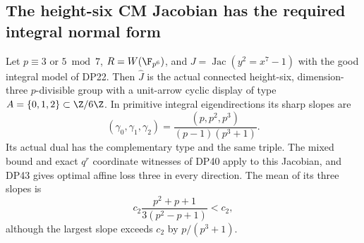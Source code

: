 \subsection{The height-six CM Jacobian has the required integral normal form}

\begin{proposition}\label{DP45}
Let $p\equiv3$ or $5\bmod7$, $R=W(\F_{p^6})$, and
$J=\operatorname{Jac}(y^2=x^7-1)$ with the good integral model of DP22.
Then $\widehat J$ is the actual connected height-six, dimension-three
$p$-divisible group with a unit-arrow cyclic display of type
$A=\{0,1,2\}\subset\Z/6\Z$.
In primitive integral eigendirections its sharp slopes are
\[
 (\gamma_0,\gamma_1,\gamma_2)
       =\frac{(p,p^2,p^3)}{(p-1)(p^3+1)}.
\]
Its actual dual has the complementary type and the same triple.
The mixed bound and exact $q^r$ coordinate witnesses of DP40 apply to this Jacobian, and DP43 gives optimal affine loss three in every direction.
The mean of its three slopes is
\[
 c_2\frac{p^2+p+1}{3(p^2-p+1)}<c_2,
\]
although the largest slope exceeds $c_2$ by $p/(p^3+1)$.
\end{proposition}

